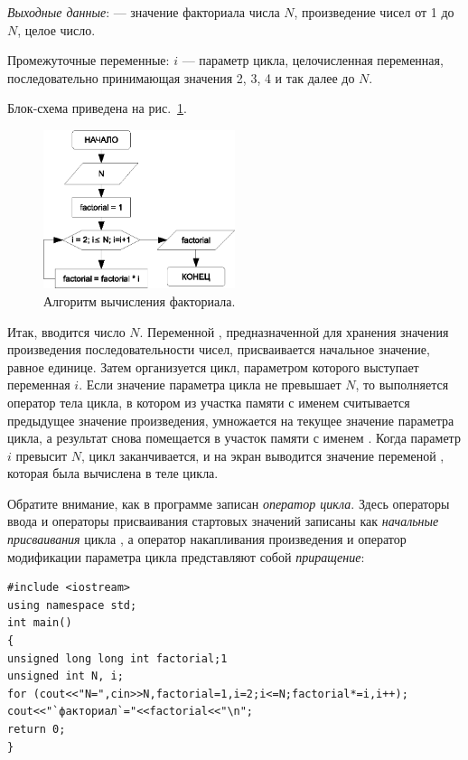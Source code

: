 \emph{Выходные данные}:  --- значение факториала числа $N$,
произведение чисел от 1 до $N$, целое число.

Промежуточные переменные: $i$ --- параметр цикла, целочисленная переменная, последовательно принимающая
значения 2, 3, 4 и так далее до $N$.

Блок-схема приведена на рис.~\ref{ch03:refDrawing28}.
\begin{figure}[htb]
\begin{center}
\includegraphics[width=0.5\textwidth]{img/ris_3_29}
\caption{Алгоритм вычисления факториала.}
\label{ch03:refDrawing28}
\end{center}
\end{figure}


Итак, вводится число $N$. Переменной , предназначенной для хранения
значения произведения последовательности чисел, присваивается начальное значение, равное единице. Затем организуется
цикл, параметром которого выступает переменная $i$. Если значение параметра цикла не превышает
$N$, то выполняется оператор тела цикла, в котором из участка памяти с именем
 считывается предыдущее значение произведения, умножается на текущее значение параметра
цикла, а результат снова помещается в участок памяти с именем . Когда параметр
$i$ превысит $N$, цикл заканчивается, и на экран выводится значение переменой
, которая была вычислена в теле цикла.

Обратите внимание, как в программе записан \emph{оператор цикла}. Здесь операторы ввода и операторы
присваивания стартовых значений записаны как \emph{начальные присваивания} цикла , а
оператор накапливания произведения и оператор модификации параметра цикла представляют собой
\emph{приращение}:
\begin{lstlisting}
#include <iostream>
using namespace std;
int main()
{
unsigned long long int factorial;1
unsigned int N, i;
for (cout<<"N=",cin>>N,factorial=1,i=2;i<=N;factorial*=i,i++);
cout<<"`факториал`="<<factorial<<"\n";
return 0;
}
\end{lstlisting}


